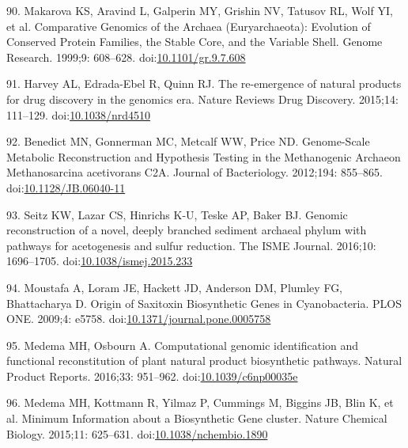 \documentclass[12pt,twoside]{reedthesis}
\begin{document}
  \hypertarget{ref-makarovaux5fcomparativeux5f1999}{}
  90. Makarova KS, Aravind L, Galperin MY, Grishin NV, Tatusov RL, Wolf
  YI, et al. Comparative Genomics of the Archaea (Euryarchaeota):
  Evolution of Conserved Protein Families, the Stable Core, and the
  Variable Shell. Genome Research. 1999;9: 608--628.
  doi:\href{https://doi.org/10.1101/gr.9.7.608}{10.1101/gr.9.7.608}
  
  \hypertarget{ref-harveyux5fre-emergenceux5f2015}{}
  91. Harvey AL, Edrada-Ebel R, Quinn RJ. The re-emergence of natural
  products for drug discovery in the genomics era. Nature Reviews Drug
  Discovery. 2015;14: 111--129.
  doi:\href{https://doi.org/10.1038/nrd4510}{10.1038/nrd4510}
  
  \hypertarget{ref-benedictux5fgenome-scaleux5f2012}{}
  92. Benedict MN, Gonnerman MC, Metcalf WW, Price ND. Genome-Scale
  Metabolic Reconstruction and Hypothesis Testing in the Methanogenic
  Archaeon Methanosarcina acetivorans C2A. Journal of Bacteriology.
  2012;194: 855--865.
  doi:\href{https://doi.org/10.1128/JB.06040-11}{10.1128/JB.06040-11}
  
  \hypertarget{ref-seitzux5fgenomicux5f2016}{}
  93. Seitz KW, Lazar CS, Hinrichs K-U, Teske AP, Baker BJ. Genomic
  reconstruction of a novel, deeply branched sediment archaeal phylum with
  pathways for acetogenesis and sulfur reduction. The ISME Journal.
  2016;10: 1696--1705.
  doi:\href{https://doi.org/10.1038/ismej.2015.233}{10.1038/ismej.2015.233}
  
  \hypertarget{ref-moustafaux5foriginux5f2009}{}
  94. Moustafa A, Loram JE, Hackett JD, Anderson DM, Plumley FG,
  Bhattacharya D. Origin of Saxitoxin Biosynthetic Genes in Cyanobacteria.
  PLOS ONE. 2009;4: e5758.
  doi:\href{https://doi.org/10.1371/journal.pone.0005758}{10.1371/journal.pone.0005758}
  
  \hypertarget{ref-medemaux5fcomputationalux5f2016}{}
  95. Medema MH, Osbourn A. Computational genomic identification and
  functional reconstitution of plant natural product biosynthetic
  pathways. Natural Product Reports. 2016;33: 951--962.
  doi:\href{https://doi.org/10.1039/c6np00035e}{10.1039/c6np00035e}
  
  \hypertarget{ref-medemaux5fminimumux5f2015}{}
  96. Medema MH, Kottmann R, Yilmaz P, Cummings M, Biggins JB, Blin K, et
  al. Minimum Information about a Biosynthetic Gene cluster. Nature
  Chemical Biology. 2015;11: 625--631.
  doi:\href{https://doi.org/10.1038/nchembio.1890}{10.1038/nchembio.1890}
  
\end{document}

